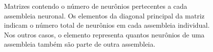\begin{figure}[!ht]
\caption{Matrizes contendo o número de neurônios pertecentes a cada assembleia neuronal. Os elementos da diagonal principal da
matriz indicam o número total de neurônios em cada assembleia individual. Nos outros casos, o elemento representa quantos
neurônios de uma assembleia também são parte de outra assembleia.}

\end{figure}

